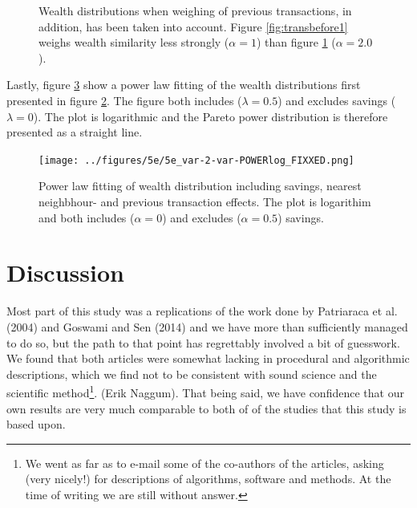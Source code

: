 \documentclass[10pt, a4paper]{amsart}
\begin{document}
\begin{figure}
\begin{subfigure}{.49\textwidth}
	\caption{}
	\label{fig:transbefore2}
\end{subfigure}
\caption{Wealth distributions when weighing of previous transactions, in addition, has been taken into account. Figure \ref{fig:transbefore1} weighs wealth similarity less strongly ($\alpha=1$) than figure \ref{fig:transbefore2} ($\alpha=2.0$).}
\label{fig:transbefore}
\end{figure}

Lastly, figure \ref{fig:transbeforefit} show a power law fitting of the wealth distributions first presented in figure \ref{fig:transbefore}. The figure both includes ($\lambda=0.5$) and excludes savings ($\lambda=0$). The plot is logarithmic and the Pareto power distribution is therefore presented as a straight line. 

\begin{figure}
	\centering
	\texttt{[image: ../figures/5e/5e\_var-2-var-POWERlog\_FIXXED.png]}
	\caption{Power law fitting of wealth distribution including savings, nearest neighbhour- and previous transaction effects. The plot is logarithim and both includes ($\alpha=0$) and excludes ($\alpha=0.5$) savings.}
	\label{fig:transbeforefit}
\end{figure}

\section{Discussion}
Most part of this study was a replications of the work done by Patriaraca et al. (2004)\cite{Patriarca} and Goswami and Sen (2014)\cite{GoswamiSen} and we have more than sufficiently managed to do so, but the path to that point has regrettably involved a bit of guesswork. We found that both articles were somewhat lacking in procedural and algorithmic descriptions, which we find not to be consistent with sound science and the scientific method\footnote{We went as far as to e-mail some of the co-authors of the articles, asking (very nicely!) for descriptions of algorithms, software and methods. At the time of writing we are still without answer.}.  (Erik Naggum)\cite{Rendering}. That being said, we have confidence that our own results are very much comparable to both of of the studies that this study is based upon. 
\end{document}
